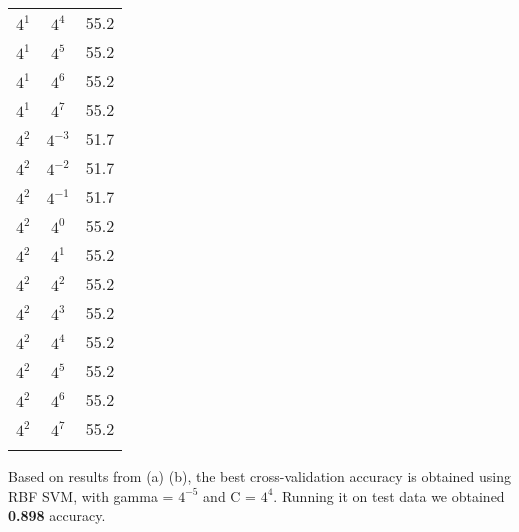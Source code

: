\documentclass[12pt]{article}
\newenvironment{problem}[2][Problem]{\begin{trivlist}
\item[\hskip \labelsep {\bfseries #1}\hskip \labelsep {\bfseries #2}]}{\end{trivlist}}
\begin{document}
\begin{problem}{5. Programming}
\begin{center}
\begin{tabular}{ c | c | c }
$4^{1 }$  & $4^{4}$  &  55.2\\
$4^{1 }$  & $4^{5}$  &  55.2\\
$4^{1 }$  & $4^{6}$  &  55.2\\
$4^{1 }$  & $4^{7}$  &  55.2\\
$4^{2 }$  & $4^{-3}$  &  51.7\\
$4^{2 }$  & $4^{-2}$  &  51.7\\
$4^{2 }$  & $4^{-1}$  &  51.7\\
$4^{2 }$  & $4^{0}$  &  55.2\\
$4^{2 }$  & $4^{1}$  &  55.2\\
$4^{2 }$  & $4^{2}$  &  55.2\\
$4^{2 }$  & $4^{3}$  &  55.2\\
$4^{2 }$  & $4^{4}$  &  55.2\\
$4^{2 }$  & $4^{5}$  &  55.2\\
$4^{2 }$  & $4^{6}$  &  55.2\\
$4^{2 }$  & $4^{7}$  &  55.2\\
 & &\\
\end{tabular}
\end{center}
Based on results from (a) (b), the best cross-validation accuracy is obtained using RBF SVM, with gamma = $4^{-5}$ and C = $4^4$. Running it on test data we obtained \textbf{0.898} accuracy.
\end{problem}
 
\end{document}

